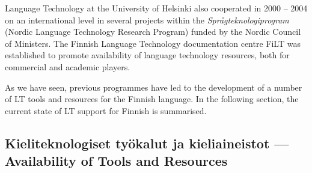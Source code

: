 \documentclass[]{../../metanetpaper}
\begin{document}
\begin{Parallel}[c]{70mm}{70mm}
{Language Technology at the University of Helsinki also cooperated in 2000 –
2004 on an international level in several projects within the
\textit{Språgteknologiprogram} (Nordic Language Technology Research Program)
funded by
the Nordic Council of Ministers. The Finnish Language Technology documentation
centre FiLT was established to promote availability of language technology
resources, both for commercial and academic players.

As we have seen, previous programmes have led to the development of a number of
LT tools and resources for the Finnish language. In the following section, the
current state of LT support for Finnish is summarised.
}

\ParallelPar

\subsection{Kieliteknologiset työkalut ja kieliaineistot --- Availability of Tools and Resources}



\ParallelPar


\end{Parallel}
\end{document}
